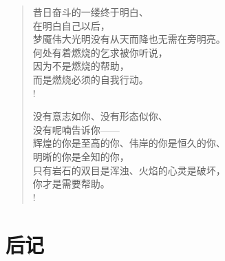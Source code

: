 \documentclass[UTF8, 12pt, a4paper]{ctexrep} %
\begin{document}
\begin{verse}
    昔日奋斗的一缕终于明白、\\
    在明白自己以后，\\
    梦魇伟大光明没有从天而降也无需在旁明亮。\\
    何处有着燃烧的乞求被你听说，\\
    因为不是燃烧的帮助，\\
    而是燃烧必须的自我行动。\\!

    没有意志如你、没有形态似你、\\
    没有呢喃告诉你——\\
    辉煌的你是至高的你、伟岸的你是恒久的你、\\
    明晰的你是全知的你，\\
    只有岩石的双目是浑浊、火焰的心灵是破坏，\\
    你才是需要帮助。\\!

\end{verse}
\newpage

\section*{后记}
\newpage
\end{document}
